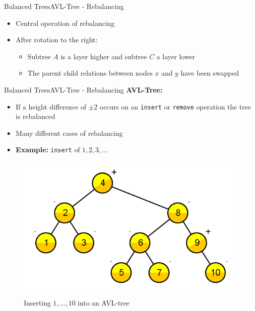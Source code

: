 \begin{frame}{Balanced Trees}{AVL-Tree - Rebalancing}
  \begin{itemize}
    \item<2->
      Central operation of {\color{Mittel-Blau}rebalancing}
    \item<3->
      After rotation to the right:
      \begin{itemize}
        \item<4->
          Subtree {\color{Mittel-Blau}$A$} is a layer higher and subtree
          {\color{Mittel-Blau}$C$} a layer lower
        \item<5->
          The parent child relations between nodes {\color{Mittel-Blau}$x$} and
          {\color{Mittel-Blau}$y$} have been swapped
      \end{itemize}
  \end{itemize}
\end{frame}


\begin{frame}{Balanced Trees}{AVL-Tree - Rebalancing}
  \textbf{AVL-Tree:}
  \begin{itemize}
    \item<2->
      If a height difference of $\pm 2$ occurs on an
      \texttt{\color{Mittel-Blau}insert} or
      \texttt{\color{Mittel-Blau}remove} operation the tree is rebalanced
    \item<3->
      Many different cases of rebalancing
    \item<4->
      \textbf{Example:}
      \texttt{\color{Mittel-Blau}insert} of $1,2,3,\dotsc$
  \end{itemize}
  \begin{figure}
    \includegraphics[width=0.5\linewidth]
      {Images/AVL-Tree/AVL-Tree_Insert1To10.png}
    \caption{Inserting $1,\dots,10$ into an AVL-tree~\cite{gnarley_trees}}
    \label{fig:balanced_trees:avl_tree_example4}
  \end{figure}
\end{frame}


